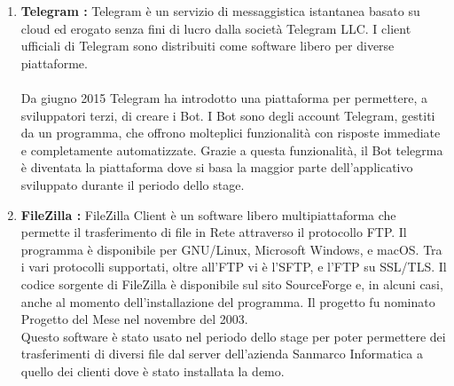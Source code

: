 \begin{enumerate}
\item \textbf{Telegram :} Telegram è un servizio di messaggistica istantanea basato su cloud ed erogato senza fini di lucro dalla società Telegram LLC. I client ufficiali di Telegram sono distribuiti come software libero per diverse piattaforme. \\\\
Da giugno 2015 Telegram ha introdotto una piattaforma per permettere, a sviluppatori terzi, di creare i Bot. I Bot sono degli account Telegram, gestiti da un programma, che offrono molteplici funzionalità con risposte immediate e completamente automatizzate. Grazie a questa funzionalità, il Bot telegrma è diventata la piattaforma dove si basa la maggior parte dell'applicativo sviluppato durante il periodo dello stage.

\item \textbf{FileZilla :} FileZilla Client è un software libero multipiattaforma che permette il trasferimento di file in Rete attraverso il protocollo FTP. Il programma è disponibile per GNU/Linux, Microsoft Windows, e macOS. Tra i vari protocolli supportati, oltre all'FTP vi è l'SFTP, e l'FTP su SSL/TLS. 
Il codice sorgente di FileZilla è disponibile sul sito SourceForge e, in alcuni casi, anche al momento dell'installazione del programma. Il progetto fu nominato Progetto del Mese nel novembre del 2003.\\
Questo software è stato usato nel periodo dello stage per poter permettere dei trasferimenti di diversi file dal server dell'azienda Sanmarco Informatica a quello dei clienti dove è stato installata la demo. \\


\end{enumerate} 






















